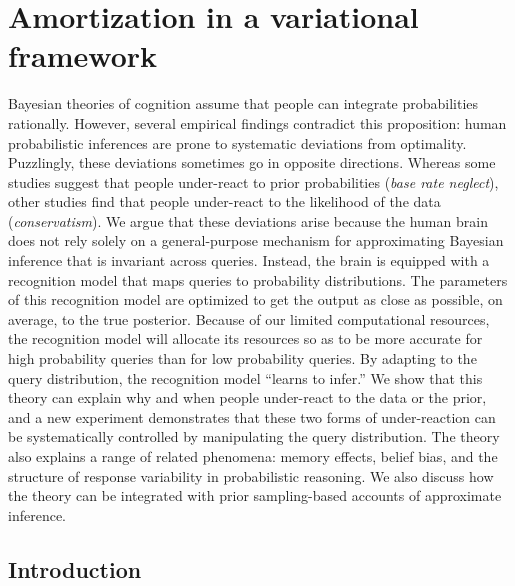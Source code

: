 
\chapter{Amortization in a variational framework}
\label{chap:LTI}

Bayesian theories of cognition assume that people can integrate probabilities rationally. However, several empirical findings contradict this proposition: human probabilistic inferences are prone to systematic deviations from optimality. Puzzlingly, these deviations sometimes go in opposite directions. Whereas some studies suggest that people under-react to prior probabilities (\emph{base rate neglect}), other studies find that people under-react to the likelihood of the data (\emph{conservatism}). We argue that these deviations arise because the human brain does not rely solely on a general-purpose mechanism for approximating Bayesian inference that is invariant across queries. Instead, the brain is equipped with a recognition model that maps queries to probability distributions. The parameters of this recognition model are optimized to get the output as close as possible, on average, to the true posterior. Because of our limited computational resources, the recognition model will allocate its resources so as to be more accurate for high probability queries than for low probability queries. By adapting to the query distribution, the recognition model ``learns to infer.'' We show that this theory can explain why and when people under-react to the data or the prior, and a new experiment demonstrates that these two forms of under-reaction can be systematically controlled by manipulating the query distribution. The theory also explains a range of related phenomena: memory effects, belief bias, and the structure of response variability in probabilistic reasoning. We also discuss how the theory can be integrated with prior sampling-based accounts of approximate inference.

\section{Introduction}

